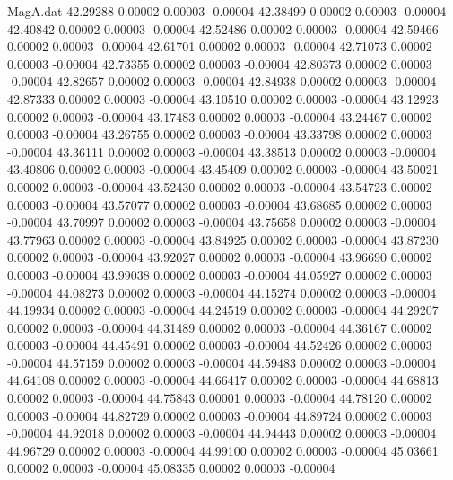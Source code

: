 \begin{filecontents}{MagA.dat}
  42.29288    0.00002    0.00003   -0.00004
  42.38499    0.00002    0.00003   -0.00004
  42.40842    0.00002    0.00003   -0.00004
  42.52486    0.00002    0.00003   -0.00004
  42.59466    0.00002    0.00003   -0.00004
  42.61701    0.00002    0.00003   -0.00004
  42.71073    0.00002    0.00003   -0.00004
  42.73355    0.00002    0.00003   -0.00004
  42.80373    0.00002    0.00003   -0.00004
  42.82657    0.00002    0.00003   -0.00004
  42.84938    0.00002    0.00003   -0.00004
  42.87333    0.00002    0.00003   -0.00004
  43.10510    0.00002    0.00003   -0.00004
  43.12923    0.00002    0.00003   -0.00004
  43.17483    0.00002    0.00003   -0.00004
  43.24467    0.00002    0.00003   -0.00004
  43.26755    0.00002    0.00003   -0.00004
  43.33798    0.00002    0.00003   -0.00004
  43.36111    0.00002    0.00003   -0.00004
  43.38513    0.00002    0.00003   -0.00004
  43.40806    0.00002    0.00003   -0.00004
  43.45409    0.00002    0.00003   -0.00004
  43.50021    0.00002    0.00003   -0.00004
  43.52430    0.00002    0.00003   -0.00004
  43.54723    0.00002    0.00003   -0.00004
  43.57077    0.00002    0.00003   -0.00004
  43.68685    0.00002    0.00003   -0.00004
  43.70997    0.00002    0.00003   -0.00004
  43.75658    0.00002    0.00003   -0.00004
  43.77963    0.00002    0.00003   -0.00004
  43.84925    0.00002    0.00003   -0.00004
  43.87230    0.00002    0.00003   -0.00004
  43.92027    0.00002    0.00003   -0.00004
  43.96690    0.00002    0.00003   -0.00004
  43.99038    0.00002    0.00003   -0.00004
  44.05927    0.00002    0.00003   -0.00004
  44.08273    0.00002    0.00003   -0.00004
  44.15274    0.00002    0.00003   -0.00004
  44.19934    0.00002    0.00003   -0.00004
  44.24519    0.00002    0.00003   -0.00004
  44.29207    0.00002    0.00003   -0.00004
  44.31489    0.00002    0.00003   -0.00004
  44.36167    0.00002    0.00003   -0.00004
  44.45491    0.00002    0.00003   -0.00004
  44.52426    0.00002    0.00003   -0.00004
  44.57159    0.00002    0.00003   -0.00004
  44.59483    0.00002    0.00003   -0.00004
  44.64108    0.00002    0.00003   -0.00004
  44.66417    0.00002    0.00003   -0.00004
  44.68813    0.00002    0.00003   -0.00004
  44.75843    0.00001    0.00003   -0.00004
  44.78120    0.00002    0.00003   -0.00004
  44.82729    0.00002    0.00003   -0.00004
  44.89724    0.00002    0.00003   -0.00004
  44.92018    0.00002    0.00003   -0.00004
  44.94443    0.00002    0.00003   -0.00004
  44.96729    0.00002    0.00003   -0.00004
  44.99100    0.00002    0.00003   -0.00004
  45.03661    0.00002    0.00003   -0.00004
  45.08335    0.00002    0.00003   -0.00004

\end{filecontents}
